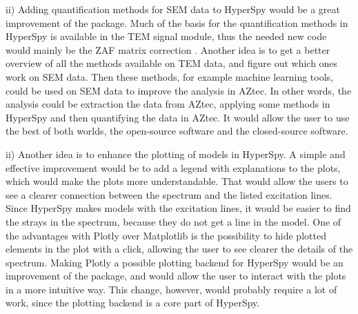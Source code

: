 ii) Adding quantification methods for SEM data to HyperSpy would be a great improvement of the package.
Much of the basis for the quantification methods in HyperSpy is available in the TEM signal module, thus the needed new code would mainly be the ZAF matrix correction \cite{ZAF_1978,goldstein_scanning_2018}.
Another idea is to get a better overview of all the methods available on TEM data, and figure out which ones work on SEM data.
Then these methods, for example machine learning tools, could be used on SEM data to improve the analysis in AZtec.
In other words, the analysis could be extraction the data from AZtec, applying some methods in HyperSpy and then quantifying the data in AZtec.
It would allow the user to use the best of both worlds, the open-source software and the closed-source software.

ii) Another idea is to enhance the plotting of models in HyperSpy.
A simple and effective improvement would be to add a legend with explanations to the plots, which would make the plots more understandable.
That would allow the users to see a clearer connection between the spectrum and the listed excitation lines.
Since HyperSpy makes models with the excitation lines, it would be easier to find the strays in the spectrum, because they do not get a line in the model.
One of the advantages with Plotly over Matplotlib is the possibility to hide plotted elements in the plot with a click, allowing the user to see clearer the details of the spectrum.
Making Plotly a possible plotting backend for HyperSpy would be an improvement of the package, and would allow the user to interact with the plots in a more intuitive way.
This change, however, would probably require a lot of work, since the plotting backend is a core part of HyperSpy.


